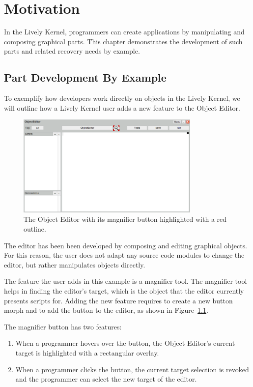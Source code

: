 \chapter{Motivation} \label{chapter:MOTIVATION}

In the Lively Kernel, programmers can create applications by manipulating and composing graphical parts.
This chapter demonstrates the development of such parts and related recovery needs by example.


\section{Part Development By Example}

To exemplify how developers work directly on objects in the Lively Kernel, we will outline how a Lively Kernel user adds a new feature to the Object Editor.

\begin{figure}[h]
    \centering
    \includegraphics[width=0.8\textwidth]{figures/3_motivation/1_magnifierButton.png}
    \caption{The Object Editor with its magnifier button highlighted with a red outline.}
    \label{fig:MagnifierButton}
\end{figure}

The editor has been been developed by composing and editing graphical objects.
For this reason, the user does not adapt any source code modules to change the editor, but rather manipulates objects directly.

The feature the user adds in this example is a magnifier tool.
The magnifier tool helps in finding the editor's target, which is the object that the editor currently presents scripts for.
Adding the new feature requires to create a new button morph and to add the button to the editor, as shown in Figure~\ref{fig:MagnifierButton}.

The magnifier button has two features:
\begin{enumerate}
    \item When a programmer hovers over the button, the Object Editor's current target is highlighted with a rectangular overlay.
    \item When a programmer clicks the button, the current target selection is revoked and the programmer can select the new target of the editor.
\end{enumerate}

